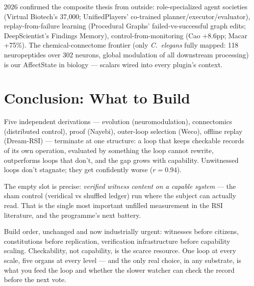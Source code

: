 \documentclass[11pt]{article}
\begin{document}
2026 confirmed the composite thesis from outside: role-specialized agent societies (Virtual Biotech's 37,000; UnifiedPlayers' co-trained planner/executor/evaluator), replay-from-failure learning (Procedural Graphs' failed-vs-successful graph edits; DeepScientist's Findings Memory), control-from-monitoring (Cao +8.6pp; Macar +75\%). The chemical-connectome frontier (only \textit{C.~elegans} fully mapped: 118 neuropeptides over 302 neurons, global modulation of all downstream processing) is our AffectState in biology --- scalars wired into every plugin's context.

\section{Conclusion: What to Build}
\label{sec:close}

Five independent derivations --- evolution (neuromodulation), connectomics (distributed control), proof (Nayebi), outer-loop selection (Weco), offline replay (Dream-RSI) --- terminate at one structure: a loop that keeps checkable records of its own operation, evaluated by something the loop cannot rewrite, outperforms loops that don't, and the gap grows with capability. Unwitnessed loops don't stagnate; they get confidently worse ($r=0.94$).

The empty slot is precise: \emph{verified witness content on a capable system} --- the sham control (veridical vs shuffled ledger) run where the subject can actually read. That is the single most important unfilled measurement in the RSI literature, and the programme's next battery.

Build order, unchanged and now industrially urgent: witnesses before citizens, constitutions before replication, verification infrastructure before capability scaling. Checkability, not capability, is the scarce resource. One loop at every scale, five organs at every level --- and the only real choice, in any substrate, is what you feed the loop and whether the slower watcher can check the record before the next vote.
\end{document}
